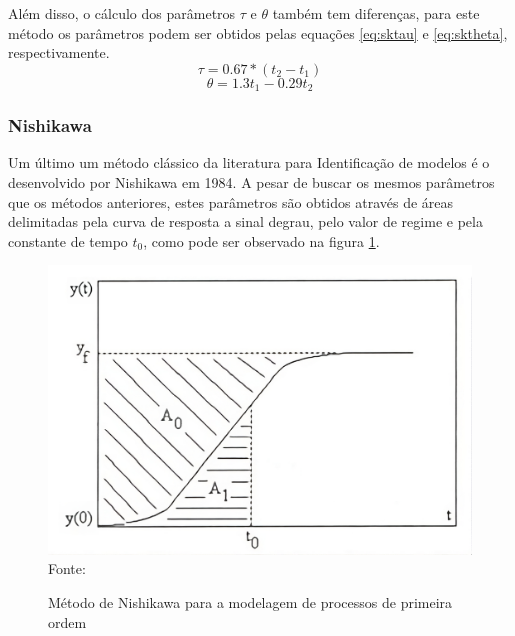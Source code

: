 Além disso, o cálculo dos parâmetros $\tau$ e $\theta$ também tem diferenças,
para este método os parâmetros podem ser obtidos pelas equações \eqref{eq:sktau} e
\eqref{eq:sktheta}, respectivamente.
\begin{equation}
    \label{eq:sktau}
    \tau = 0.67*(t_2 - t_1)
\end{equation}
\begin{equation}
    \label{eq:sktheta}
    \theta = 1.3t_1 - 0.29t_2
\end{equation}

\subsubsection{Nishikawa}\label{subsubsec:nkfun}

Um último um método clássico da literatura para Identificação de modelos é o desenvolvido por Nishikawa em 1984.
A pesar de buscar os mesmos parâmetros que os métodos anteriores, estes parâmetros são obtidos através de áreas
delimitadas pela curva de resposta a sinal degrau, pelo valor de regime e pela constante de tempo $t_0$, como pode ser
observado na figura \ref{fig:ni_ident_meth}.


\begin{figure}[H]
    \centering
    \caption{Método de Nishikawa para a modelagem de processos de primeira ordem}
    \includegraphics[scale=0.3]{figuras/ni_ident_meth}
    \label{fig:ni_ident_meth}
    \\
    \vspace{0cm}\hspace{0cm}\small{Fonte: \cite{CoelhoIdentificacao}}
\end{figure}

